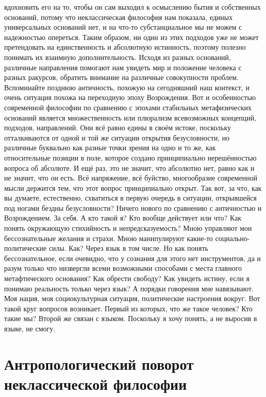 вдохновить его на то, чтобы он сам выходил к осмыслению бытия и собственных
оснований, потому что неклассическая философия нам показала, единых
универсальных оснований нет, и на что-то субстанциальное мы не можем с
надежностью опереться. Таким образом, ни один из этих подходов уже не может
претендовать на единственность и абсолютную истинность, поэтому полезно понимать
их взаимную дополнительность. Исходя из разных оснований, различные направления
помогают нам увидеть мир и положение человека с разных ракурсов, обратить
внимание на различные совокупности проблем. Вспоминайте позднюю античность,
похожую на сегодняшний наш контекст, и очень ситуация похожа на переходную эпоху
Возрождения. Вот и особенностью современной философии по сравнению с эпохами
стабильных метафизических оснований является множественность или плюрализм
всевозможных концепций, подходов, направлений. Они всё равно едины в своём
истоке, поскольку отталкиваются от одной и той же ситуации открытия
безусловности, но различные буквально как разные точки зрения на одно и то же,
как относительные позиции в поле, которое создано принципиально нерешённостью
вопроса об абсолюте. И ещё раз, это не значит, что абсолютно нет, равно как и не
значит, что он есть. Всё напряжение, всё буйство, многообразие современной мысли
держится тем, что этот вопрос принципиально открыт. Так вот, за что, как вы
думаете, естественно, схватиться в первую очередь в ситуации, открывшейся под
ногами бездны безусловности? Ничего нового по сравнению с античностью и
Возрождением. За себя. А кто такой я? Кто вообще действует или что? Как понять
окружающую стихийность и непредсказуемость? Мною управляют мои бессознательные
желания и страхи. Мною манипулируют какие-то социально-политические силы. Как?
Через язык в том числе. Но как понять бессознательное, если очевидно, что у
сознания для этого нет инструментов, да и разум только что низвергли всеми
возможными способами с места главного метафтического основания? Как обрести
свободу? Как увидеть истину, если я понимаю реальность только через язык? А
порядки говорения мне навязывают. Моя нация, моя социокультурная ситуация,
политические настроения вокруг. Вот такой круг вопросов возникает. Первый из
которых, что же такое человек? Кто такие мы? Второй же связан с языком.
Поскольку я хочу понять, а не выросив в языке, не смогу. 


\section{Антропологический поворот неклассической философии} 

